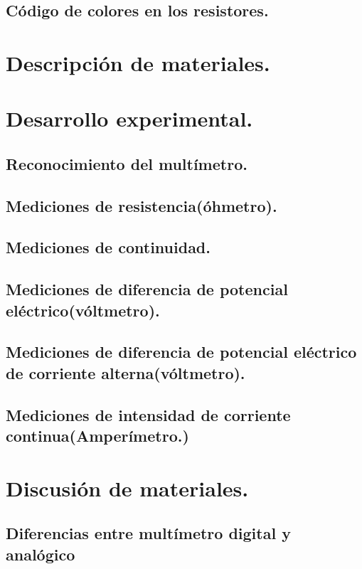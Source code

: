 \documentclass[10pt]{article}
\begin{document}
\begin{multicols}{2}
\subsection{Código de colores en los resistores.}

\section{Descripción de materiales.}


\section{Desarrollo experimental.}

\subsection{Reconocimiento del multímetro.}


\subsection{Mediciones de resistencia(óhmetro).}


\subsection{Mediciones de continuidad.}

\subsection{Mediciones de diferencia de potencial eléctrico(vóltmetro).}

\subsection{Mediciones de diferencia de potencial eléctrico de corriente alterna(vóltmetro).}


\subsection{Mediciones de intensidad de corriente continua(Amperímetro.)}

\section{Discusión de materiales.}

\subsection{Diferencias entre multímetro digital y analógico}


\end{multicols}
\end{document}
